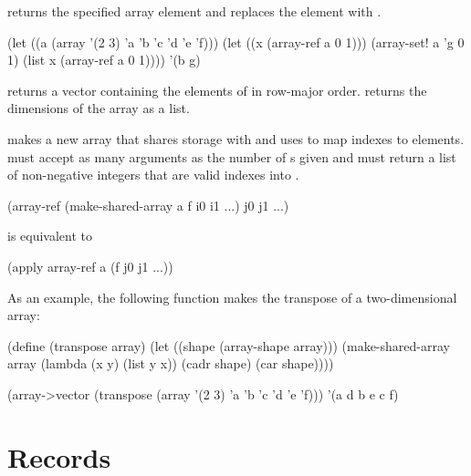 \begin{protos}
\end{protos}
\noindent
{} returns the specified array element and 
 replaces the element with .
\begin{example}
(let ((a (array '(2 3) 'a 'b 'c 'd 'e 'f)))
  (let ((x (array-ref a 0 1)))
    (array-set! a 'g 0 1)
    (list x (array-ref a 0 1))))
    \evalsto '(b g)
\end{example}

 returns a vector containing the elements of 
 in row-major order.
 returns the dimensions of
 the array as a list.

\begin{protos}
\end{protos}
\noindent
{} makes a new array that shares storage with 
 and uses  to map indexes to elements.
 must accept as many arguments as the number of
 s given and must return a list of non-negative integers
 that are valid indexes into .
\begin{example}
(array-ref (make-shared-array a f i0 i1 ...)
           j0 j1 ...)
\end{example}
is equivalent to
\begin{example}
(apply array-ref a (f j0 j1 ...))
\end{example}

As an example, the following function makes the transpose of a two-dimensional
 array:
\begin{example}
(define (transpose array)
  (let ((shape (array-shape array)))
    (make-shared-array array
                       (lambda (x y)
                         (list y x))
                       (cadr shape)
                       (car shape))))

(array->vector
  (transpose
    (array '(2 3) 'a 'b 'c 'd 'e 'f)))
      \evalsto '(a d b e c f)
\end{example}

\section{Records}
\label{records}

